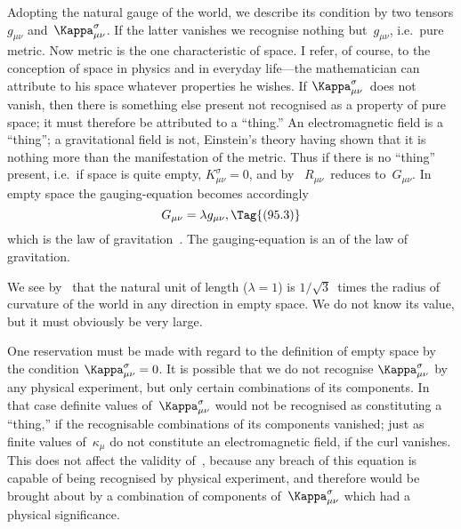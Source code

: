 \documentclass[12pt]{book}
\begin{document}
Adopting the natural gauge of the world, we describe its condition by
%
two tensors $g_{\mu\nu}$ and~$\Kappa_{\mu\nu}^{\sigma}$. If the latter vanishes we recognise nothing but~$g_{\mu\nu}$,
i.e.\ pure metric. Now metric is the one characteristic of space. I refer, of
%
course, to the conception of space in physics and in everyday life---the mathematician
can attribute to his space whatever properties he wishes. If $\Kappa_{\mu\nu}^{\sigma}$~does
not vanish, then there is something else present not recognised as a property
%
of pure space; it must therefore be attributed to a ``thing\footnotemark.''\footnotetext
  {An electromagnetic field is a ``thing''; a gravitational field is not, Einstein's theory having
  shown that it is nothing more than the manifestation of the metric.}
Thus if there
is no ``thing'' present, i.e.\ if space is quite empty, $K_{\mu\nu}^{\sigma} = 0$, and by~ $R_{\mu\nu}$~reduces
to~$G_{\mu\nu}$. In empty space the gauging-equation becomes accordingly
%
\[
G_{\mu\nu} = \lambda g_{\mu\nu},
\Tag{(95.3)}
\]
which is the law of gravitation~. The gauging-equation is an  of the
law of gravitation.

We see by~ that the natural unit of length ($\lambda= 1$) is $1/\sqrt{3}$~times the
radius of curvature of the world in any direction in empty space. We do not
know its value, but it must obviously be very large.

One reservation must be made with regard to the definition of empty
space by the condition $\Kappa_{\mu\nu}^{\sigma} = 0$. It is possible that we do not recognise $\Kappa_{\mu\nu}^{\sigma}$ by
any physical experiment, but only certain combinations of its components. In
that case definite values of~$\Kappa_{\mu\nu}^{\sigma}$ would not be recognised as constituting a
``thing,'' if the recognisable combinations of its components vanished; just as
finite values of~$\kappa_{\mu}$ do not constitute an electromagnetic field, if the curl
vanishes. This does not affect the validity of~, because any breach of
this equation is capable of being recognised by physical experiment, and
therefore would be brought about by a combination of components of~$\Kappa_{\mu\nu}^{\sigma}$ which
had a physical significance.

%
%
\end{document}
